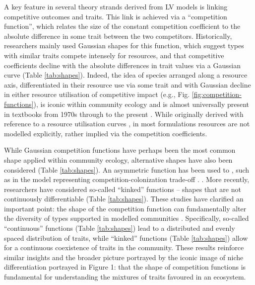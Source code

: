 \documentclass[a4paper,11pt]{article}
\newcommand{\verify}[1]{{\color{navy}{(verify: #1)}}}
\newcommand{\todo}[1]{{\color{navy}{(todo: #1)}}}
\begin{document}
A key feature in several theory strands derived from LV models is linking competitive outcomes and traits. This link is achieved via a ``competition function'', which relates the size of the constant competition coefficient to the absolute difference in some trait between the two competitors. Historically, researchers mainly used Gaussian shapes for this function, which suggest types with similar traits compete intensely for resources, and that competitive coefficients decline with the absolute differences in trait values via a Gaussian curve (Table \ref{tab:shapes}). Indeed, the idea of species arranged along a resource axis, differentiated in their resource use via some trait and with Gaussian decline in either resource utilisation of competitive impact (e.g., Fig. \ref{fig:competition-functions}), is iconic within community ecology and is almost universally present in textbooks from 1970s through to the present \citep[e.g.,][]{Krebs-1972, Ricklefs-1973, Ricklefs-1999, Krebs-2013}. While originally derived with reference to a resource utilisation curves \citep{MacArthur-1967, Roughgarden-1979}, in most formulations resources are not modelled explicitly, rather implied via the competition coefficients.

While Gaussian competition functions have perhaps been the most common shape applied within community ecology, alternative shapes have also been considered (Table \ref{tab:shapes}). An asymmetric function has been used to \todo{...., ref}, such as in the model representing competition-colonization trade-off \todo{ref}. \todo{ Offset Gaussian.}. More recently, researchers have considered so-called ``kinked'' functions -- shapes that are not continuously differentiable (Table \ref{tab:shapes}). These studies have clarified an important point: the shape of the competition function can fundamentally alter the diversity of types supported in modelled communities \citep{Calcagno-2006, Scheffer-2006, Pigolotti-2007, Leimar-2013, Barabas-2013}. Specifically, so-called ``continuous'' functions (Table \ref{tab:shapes}) lead to a distributed and evenly spaced distribution of traits, while ``kinked'' functions (Table \ref{tab:shapes}) allow for a continuous coexistence of traits in the community. These results reinforce similar insights \verify{suggested in earlier theory about limiting similarity} \todo{(refs)} and the broader picture portrayed by the iconic image of niche differentiation portrayed in Figure 1: that the shape of competition functions is fundamental for understanding the mixtures of traits favoured in an ecosystem.
\end{document}
